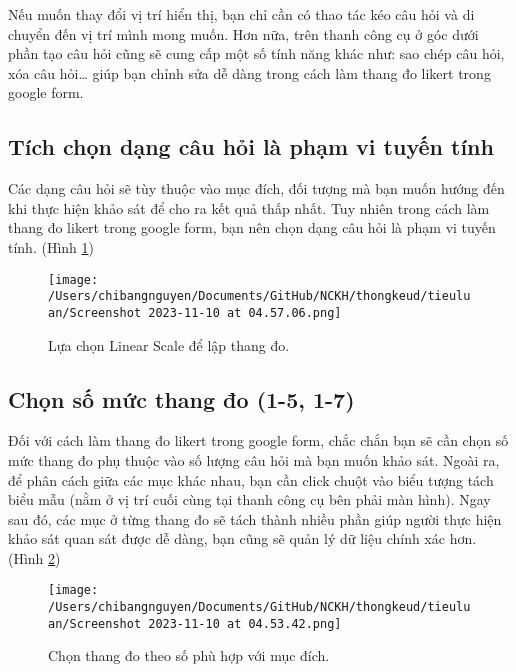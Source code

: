 \documentclass[12pt]{article}
\begin{document}
Nếu muốn thay đổi vị trí hiển thị, bạn chỉ cần có thao tác kéo câu hỏi và di chuyển đến vị trí mình mong muốn. Hơn nữa, trên thanh công cụ ở góc dưới phần tạo câu hỏi cũng sẽ cung cấp một số tính năng khác như: sao chép câu hỏi, xóa câu hỏi… giúp bạn chỉnh sửa dễ dàng trong cách làm thang đo likert trong google form. 

\vspace{1cm}

\subsection{Tích chọn dạng câu hỏi là phạm vi tuyến tính}

\vspace{.5cm}

Các dạng câu hỏi sẽ tùy thuộc vào mục đích, đối tượng mà bạn muốn hướng đến khi thực hiện khảo sát để cho ra kết quả thấp nhất. Tuy nhiên trong cách làm thang đo likert trong google form, bạn nên chọn dạng câu hỏi là phạm vi tuyến tính. (Hình \ref{7})

\begin{figure}
    \centering
    \texttt{[image: /Users/chibangnguyen/Documents/GitHub/NCKH/thongkeud/tieuluan/Screenshot 2023-11-10 at 04.57.06.png]}
    \caption{Lựa chọn Linear Scale để lập thang đo.}
    \label{7}
\end{figure}

\vspace{1cm}

\subsection{Chọn số mức thang đo (1-5, 1-7)}

\vspace{.5cm}

Đối với cách làm thang đo likert trong google form, chắc chắn bạn sẽ cần chọn số mức thang đo phụ thuộc vào số lượng câu hỏi mà bạn muốn khảo sát. Ngoài ra, để phân cách giữa các mục khác nhau, bạn cần click chuột vào biểu tượng tách biểu mẫu (nằm ở vị trí cuối cùng tại thanh công cụ bên phải màn hình). Ngay sau đó, các mục ở từng thang đo sẽ tách thành nhiều phần giúp người thực hiện khảo sát quan sát được dễ dàng, bạn cũng sẽ quản lý dữ liệu chính xác hơn. (Hình \ref{4})

\begin{figure}
    \centering
    \texttt{[image: /Users/chibangnguyen/Documents/GitHub/NCKH/thongkeud/tieuluan/Screenshot 2023-11-10 at 04.53.42.png]}
    \caption{Chọn thang đo theo số phù hợp với mục đích.}
    \label{4}
\end{figure}
\end{document}
